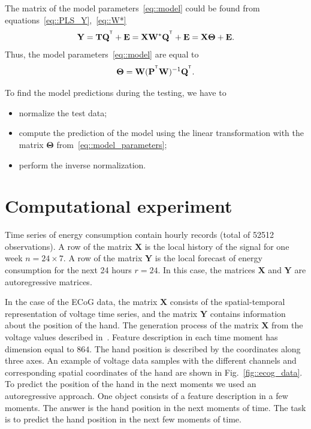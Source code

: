 \documentclass[12pt,twoside]{article}
\newcommand{\bY}{\mathbf{Y}}
\newcommand{\bX}{\mathbf{X}}
\newcommand{\bP}{\mathbf{P}}
\newcommand{\bT}{\mathbf{T}}
\newcommand{\bQ}{\mathbf{Q}}
\newcommand{\bE}{\mathbf{E}}
\newcommand{\bW}{\mathbf{W}}
\newcommand{\bTheta}{\boldsymbol{\Theta}}
\newcommand{\T}{^{\text{\tiny\sffamily\upshape\mdseries T}}}
\begin{document}
The matrix of the model parameters~\ref{eq::model} could be found from equations~\eqref{eq::PLS_Y},~\eqref{eq::W*}
\begin{equation*}
    \bY = \bT \bQ^{\T} + \bE = \bX \bW^* \bQ^{\T} + \bE = \bX \bTheta + \bE.
\end{equation*}
Thus, the model parameters~\eqref{eq::model} are equal to
\begin{equation}
    \bTheta = \bW (\bP^{\T} \bW)^{-1} \bQ^{\T}.
    \label{eq::model_parameters}
\end{equation}

To find the model predictions during the testing, we have to
\begin{itemize}
	\item normalize the test data;
	\item compute the prediction of the model using the linear transformation with the matrix $\bTheta$ from~\eqref{eq::model_parameters};
	\item perform the inverse normalization.
\end{itemize}

\section{Computational experiment}
\label{sec:exper}

Time series of energy consumption contain hourly records (total of 52512 observations). 
A row of the matrix $\bX$ is the local history of the signal for one week $n = 24 \times 7$. 
A row of the matrix $\bY$ is the local forecast of energy consumption for the next 24 hours $r = 24$. 
In this case, the matrices $\bX$ and $\bY$ are autoregressive matrices.

In the case of the ECoG data, the matrix $\bX$ consists of the spatial-temporal representation of voltage time series, and the matrix $\bY$ contains information about the position of the hand.
The generation process of the matrix $\bX$ from the voltage values described in~\cite{gasanov2017pls}. 
Feature description in each time moment has dimension equal to $864$. The hand position is described by the coordinates along three axes. 
An example of voltage data samples with the different channels and corresponding spatial coordinates of the hand are shown in Fig.~\ref{fig::ecog_data}.
To predict the position of the hand in the next moments we used an autoregressive approach.
One object consists of a feature description in a few moments. 
The answer is the hand position in the next moments of time.
The task is to predict the hand position in the next few moments of time.
\end{document}
